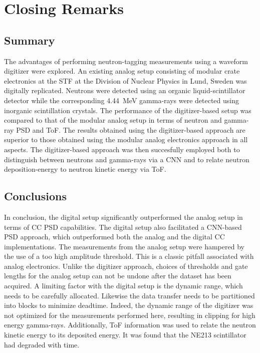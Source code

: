 \documentclass[main.tex]{subfiles}
\begin{document}
\chapter{Closing Remarks}
\section{Summary}
The advantages of performing neutron-tagging measurements using a waveform digitizer were explored. An existing analog setup consisting of modular crate electronics at the STF at the Division of Nuclear Physics  in Lund, Sweden was digitally replicated. Neutrons were detected using an organic liquid-scintillator detector while the corresponding \SI{4.44}{MeV} gamma-rays were detected using inorganic scintillation crystals. The performance of the digitizer-based setup was compared to that of the modular analog setup in terms of neutron and gamma-ray PSD and ToF. The results obtained using the digitizer-based approach are superior to those obtained using the modular analog electronics approach in all aspects. The digitizer-based approach was then succesfully employed both to distinguish between neutrons and gamma-rays via a CNN and to relate neutron deposition-energy to neutron kinetic energy via ToF.

\section{Conclusions}
In conclusion, the digital setup significantly outperformed the analog setup in terms of CC PSD capabilities. 
The digital setup also facilitated a CNN-based PSD approach, which outperformed both the analog and the digital CC implementations.
The measurements from the analog setup were hampered by the use of a too high amplitude threshold. This is a classic pitfall associated with analog electronics. Unlike the digitizer approach, choices of thresholds and gate lengths for the analog setup can not be undone after the dataset has been acquired.
A limiting factor with the digital setup is the dynamic range, which needs to be carefully allocated. 
Likewise the data transfer needs to be partitioned into blocks to minimize deadtime. 
Indeed, the dynamic range of the digitizer was not optimized for the measurements performed here, resulting in clipping for high energy gamma-rays. 
Additionally, ToF information was used to relate the neutron kinetic energy to its deposited energy. It was found that the NE213 scintillator had degraded with time.
\end{document}
